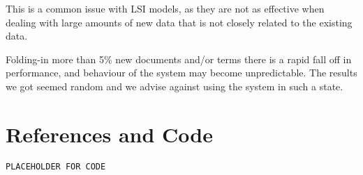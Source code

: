 \documentclass[12pt,a4paper]{article}
\begin{document}
\bigskip
\noindent This is a common issue with LSI models, as they are not as effective when dealing with large amounts of new data that is not closely related to the existing data.

\bigskip
\noindent Folding-in more than 5\% new documents and/or terms there is a rapid fall off in performance, and behaviour of the system may become unpredictable. The results we got seemed random and we advise against using the system in such a state.
\newpage
\section{References and Code}

\begin{lstlisting}[style=Matlab-Pyglike]
PLACEHOLDER FOR CODE
\end{lstlisting}
\end{document}
